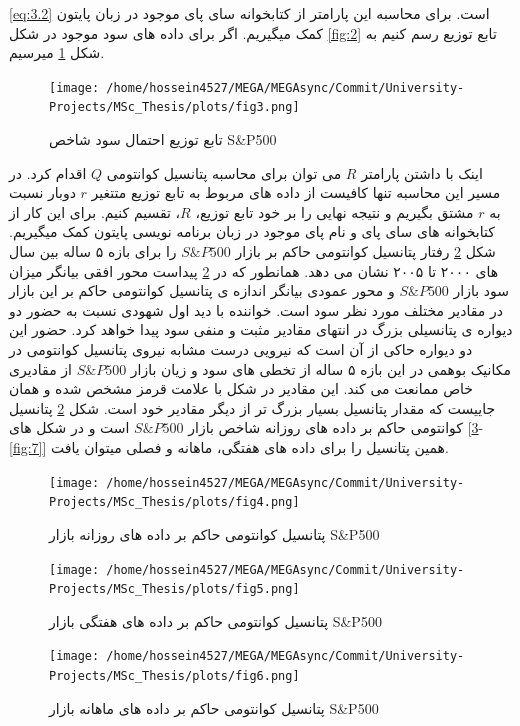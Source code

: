 \documentclass[a4paper,titlepage,12pt,fleqn,oneside]{report}
\begin{document}
	\ref{eq:3.2}
	است. برای محاسبه این پارامتر از کتابخوانه سای پای موجود در زبان پایتون کمک میگیریم. اگر برای داده های سود موجود در شکل 
	\ref{fig:2}
	تابع توزیع رسم کنیم به شکل
	\ref{fig:3}
	میرسیم.
	\begin{figure}[ptb]
		\centering
		\texttt{[image: /home/hossein4527/MEGA/MEGAsync/Commit/University-Projects/MSc\_Thesis/plots/fig3.png]}
		\caption{تابع توزیع احتمال سود شاخص S\&P500}
		\label{fig:3}
	\end{figure}
	\newpage
	اینک با داشتن پارامتر $R$ می توان برای محاسبه پتانسیل کوانتومی $Q$ اقدام کرد.  در مسیر این محاسبه تنها کافیست از داده های مربوط به تابع توزیع متتغیر $r$ دوبار نسبت به $r$ مشتق بگیریم و نتیجه نهایی را بر خود تابع توزیع، $R$، تقسیم کنیم. برای این کار از کتابخوانه های سای پای و نام پای موجود در زبان برنامه نویسی پایتون کمک میگیریم. شکل
	\ref{fig:4}
	رفتار پتانسیل کوانتومی حاکم بر بازار 
	$S\&P500$
	را برای بازه ۵ ساله بین سال های ۲۰۰۰ تا ۲۰۰۵ نشان می دهد. همانطور که در 
	\ref{fig:4}
	پیداست محور افقی بیانگر میزان سود بازار
	$S\&P500$
	و محور عمودی بیانگر اندازه ی پتانسیل کوانتومی حاکم بر این بازار در مقادیر مختلف مورد نظر سود است. خواننده با دید اول شهودی نسبت به حضور دو دیواره ی پتانسیلی بزرگ در انتهای مقادیر مثبت و منفی سود پیدا خواهد کرد. حضور این دو دیواره حاکی از آن است که نیرویی درست مشابه نیروی پتانسیل کوانتومی در مکانیک بوهمی در این بازه ۵ ساله از تخطی های سود و زیان بازار 
	$S\&P500$
	از مقادیری خاص ممانعت می کند. این مقادیر در شکل با علامت قرمز مشخص شده و همان جاییست که مقدار پتانسیل بسیار بزرگ تر از دیگر مقادیر خود است. شکل 
	\ref{fig:4}
	پتانسیل کوانتومی حاکم بر داده های روزانه شاخص بازار 
	$S\&P500$
	است و در شکل های 
	[\ref{fig:5}-\ref{fig:7}]
	همین پتانسیل را برای داده های هفتگی، ماهانه و فصلی میتوان یافت.
	
	\begin{figure}[ptb]
		\centering
		\texttt{[image: /home/hossein4527/MEGA/MEGAsync/Commit/University-Projects/MSc\_Thesis/plots/fig4.png]}
		\caption{پتانسیل کوانتومی حاکم بر داده های روزانه بازار S\&P500}
		\label{fig:4}
	\end{figure}
	
	\begin{figure}[ptb]
		\centering
		\texttt{[image: /home/hossein4527/MEGA/MEGAsync/Commit/University-Projects/MSc\_Thesis/plots/fig5.png]}
		\caption{پتانسیل کوانتومی حاکم بر داده های هفتگی بازار S\&P500}
		\label{fig:5}
	\end{figure}
	
	\begin{figure}[ptb]
		\centering
		\texttt{[image: /home/hossein4527/MEGA/MEGAsync/Commit/University-Projects/MSc\_Thesis/plots/fig6.png]}
		\caption{پتانسیل کوانتومی حاکم بر داده های ماهانه بازار S\&P500}
		\label{fig:6}
	\end{figure}
	
\end{document}
